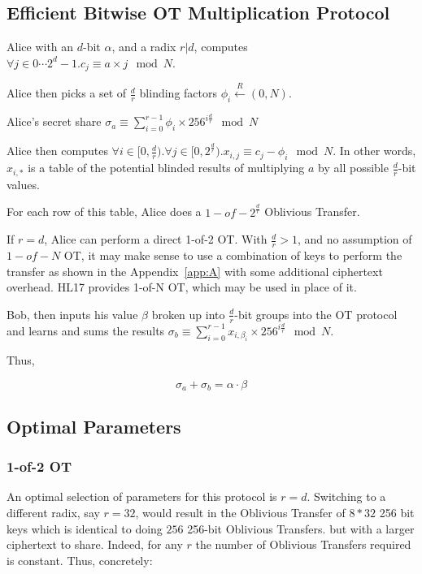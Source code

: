 \documentclass{article}
\begin{document}
\subsection{Efficient Bitwise OT Multiplication Protocol}

Alice with an $d$-bit $\alpha$, and a radix $r | d$, computes $\forall j \in 0\cdots 2^d -1. c_j \equiv  a \times j \mod N$.

Alice then picks a set of $\frac{d}{r}$ blinding factors $\phi_i \xleftarrow{R} (0, N)$.

Alice's secret share $\sigma_a \equiv \sum\limits_{i=0}^{r-1} \phi_i \times 256^{i\frac{d}{r}} \mod N$

Alice then computes $\forall i \in [0, \frac{d}{r}). \forall j \in [0, 2^{\frac{d}{r}}). x_{i, j} \equiv c_j - \phi_i \mod N$. In other words, $x_{i,*}$ is a table of the potential blinded results of multiplying $a$ by all possible $\frac{d}{r}$-bit values.

For each row of this table, Alice does a $1-of-2^\frac{d}{r}$ Oblivious Transfer. 

If $r = d$, Alice can perform a direct 1-of-2 OT. With $\frac{d}{r} > 1$, and no assumption of $1-of-N$ OT, it may make sense to use a combination of keys to perform the transfer as shown in the Appendix~\ref{app:A} with some additional ciphertext overhead. HL17 provides 1-of-N OT, which may be used in place of it.




Bob, then inputs his value $\beta$ broken up into $\frac{d}{r}$-bit groups into the OT protocol and learns and sums the results $\sigma_b \equiv \sum\limits_{i=0}^{r-1} x_{i, \beta_i} \times 256^{i\frac{d}{r}} \mod N$.

Thus,

$$\sigma_a + \sigma_b = \alpha \cdot \beta$$


\subsection{Optimal Parameters}
\subsubsection{1-of-2 OT}
An optimal selection of parameters for this protocol is $r=d$. Switching to a different radix, say $r=32$, would result in the Oblivious Transfer of $8*32$ 256 bit keys which is identical to doing $256$ 256-bit Oblivious Transfers. but with a larger ciphertext to share. Indeed, for any $r$ the number of Oblivious Transfers required is constant. Thus, concretely:
\end{document}
